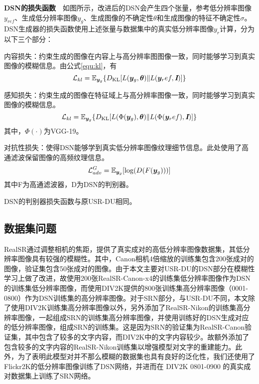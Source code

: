 \noindent\textbf{DSN的损失函数}\ \ 如图所示，改进后的DSN会产生四个张量，参考低分辨率图像$y_{ref}$、生成低分辨率图像$y_g$、生成图像的不确定性$\theta$和生成图像的特征不确定性$\sigma$。DSN生成器的损失函数使用上述张量与数据集中的真实低分辨率图像$y_r$计算，分为以下三个部分：

内容损失：约束生成的图像在内容上与高分辨率图图像一致，同时能够学习到真实图像的模糊信息。由公式\ref{equ:kl}，有
\begin{equation}
    \mathcal{L}_{kl}=\mathbb{E}_{\vb*{y}_g}\{D_{\text{KL}}[L(\vb*{y}_g,\bm{\theta})\|L(\vb*{y}_ref,\textbf{\em I})]\}
\end{equation}

感知损失：约束生成的图像在特征域上与高分辨率图像一致，同时能够学习到真实图像的模糊信息。
\begin{equation}
    \mathcal{L}_{kl}=\mathbb{E}_{\vb*{y}_g}\{D_{\text{KL}}[L(\Phi(\vb*{y}_g),\bm{\theta})\|L(\Phi(\vb*{y}_ref),\textbf{\em I})]\}
\end{equation}
其中，$\Phi(\cdot)$为VGG-19。

对抗性损失：使得DSN能够学到真实低分辨率图像纹理细节信息。此处使用了高通滤波保留图像的高频纹理信息。
\begin{equation}
    \mathcal{L}_{adv}^G=\mathbb{E}_{\vb*{y}_g}[\log(D(F(\vb*{y}_g)))]
\end{equation}
其中F为高通滤波器，D为DSN的判别器。

DSN的判别器损失函数与原USR-DU相同。

\subsection{数据集问题}
RealSR通过调整相机的焦距，提供了真实成对的高低分辨率图像数据集，其低分辨率图像具有较强的模糊性。其中，Canon相机4倍缩放的训练集包含200张成对的图像，验证集包含50张成对的图像。由于本文主要对USR-DU的DSN部分在模糊性学习上做了改进，故使用200张RealSR-Canon-x4的训练集低分辨率图像作为DSN的训练集低分辨率图像，而使用DIV2K提供的800张训练集高分辨率图像（0001-0800）作为DSN训练集的高分辨率图像。对于SRN部分，与USR-DU不同，本文除了使用DIV2K训练集高分辨率图像以外，另外添加了RealSR-Nikon的训练集高分辨率图像，一起组成SRN的训练集高分辨率图像，并使用训练好的DSN生成对应的低分辨率图像，组成SRN的训练集。这是因为SRN的验证集为RealSR-Canon验证集，其中包含了较多的文字内容，而DIV2K中的文字内容较少。故额外添加了包含较多的文字内容的RealSR-Nikon训练集以增强模型对文字的重建能力。此外，为了表明此模型对并不那么模糊的数据集也具有良好的泛化性，我们还使用了Flickr2K的低分辨率图像训练了DSN网络，并进而在 DIV2K 0801-0900 的真实成对数据集上训练了SRN网络。
